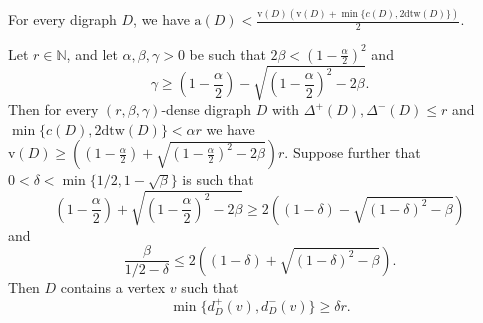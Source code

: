 \documentclass[10pt,a4paper]{amsart}
\begin{document}
\begin{observation}\label{obs:densebound}
For every digraph $D$, we have $\mathrm{a}(D)< \frac{\mathrm{v}(D)(\mathrm{v}(D)+\min\{c(D),2\mathrm{dtw}(D)\})}{2}$.
\end{observation}

\begin{lemma}\label{lem:highoutandin}
Let $r\in \mathbb{N}$, and let $\alpha,\beta,\gamma>0$ be such that $2\beta<\left(1-\frac{\alpha}{2}\right)^2$ and $$\gamma\ge \left(1-\frac{\alpha}{2}\right)-\sqrt{\left(1-\frac{\alpha}{2}\right)^2-2\beta}.$$ Then for every $(r,\beta,\gamma)$-dense digraph $D$ with $\Delta^+(D), \Delta^-(D)\le r$ and $\min\{c(D),2\mathrm{dtw}(D)\}<\alpha r$ we have $\mathrm{v}(D)\ge \left(\left(1-\frac{\alpha}{2}\right)+\sqrt{\left(1-\frac{\alpha}{2}\right)^2-2\beta}\right)r$.
Suppose further that $0<\delta<\min\{1/2,1-\sqrt{\beta}\}$ is such that
$$\left(1-\frac{\alpha}{2}\right)+\sqrt{\left(1-\frac{\alpha}{2}\right)^2-2\beta}\ge 2((1-\delta)-\sqrt{(1-\delta)^2-\beta}) $$ and
$$\frac{\beta}{1/2-\delta}\le 2((1-\delta)+\sqrt{(1-\delta)^2-\beta}).$$
Then $D$ contains a vertex $v$ such that $$\min\{d_D^+(v),d_D^-(v)\}\ge \delta r.$$
\end{lemma}
\end{document}
